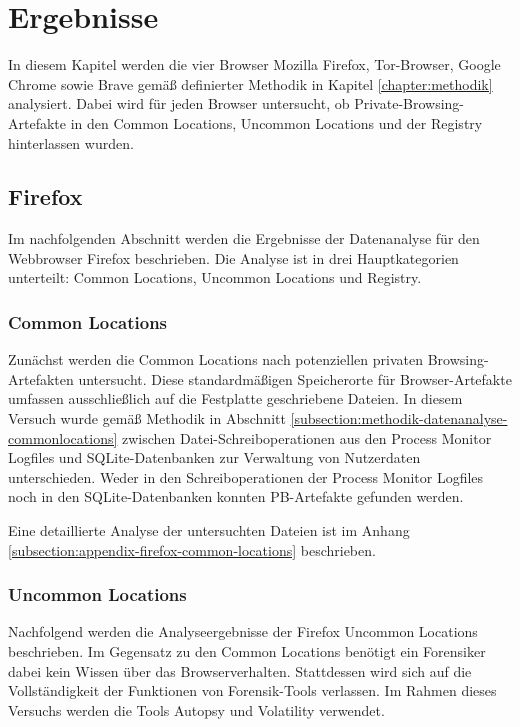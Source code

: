 \chapter{Ergebnisse}
\label{chapter:ergebnisse}

In diesem Kapitel werden die vier Browser Mozilla Firefox, Tor-Browser, Google Chrome sowie Brave gemäß definierter Methodik in Kapitel \ref{chapter:methodik} analysiert. Dabei wird für jeden Browser untersucht, ob Private-Browsing-Artefakte in den Common Locations, Uncommon Locations und der Registry hinterlassen wurden. 


\section{Firefox}
\label{section:ergebnisse-firefox}
Im nachfolgenden Abschnitt werden die Ergebnisse der Datenanalyse für den Webbrowser Firefox beschrieben. Die Analyse ist in drei Hauptkategorien unterteilt: Common Locations, Uncommon Locations und Registry.

\subsection*{Common Locations}
\label{subsection:ergebnisse-firefox-commonlocations}
Zunächst werden die Common Locations nach potenziellen privaten Browsing-Artefakten untersucht. Diese standardmäßigen Speicherorte für Browser-Artefakte umfassen ausschließlich auf die Festplatte geschriebene Dateien. In diesem Versuch wurde gemäß Methodik in Abschnitt \ref{subsection:methodik-datenanalyse-commonlocations} zwischen Datei-Schreiboperationen aus den Process Monitor Logfiles und SQLite-Datenbanken zur Verwaltung von Nutzerdaten unterschieden. Weder in den Schreiboperationen der Process Monitor Logfiles noch in den SQLite-Datenbanken konnten PB-Artefakte gefunden werden. 

Eine detaillierte Analyse der untersuchten Dateien ist im Anhang \ref{subsection:appendix-firefox-common-locations} beschrieben.

\subsection*{Uncommon Locations}
\label{subsection:ergebnisse-firefox-uncommonlocations}
Nachfolgend werden die Analyseergebnisse der Firefox Uncommon Locations beschrieben.
Im Gegensatz zu den Common Locations benötigt ein Forensiker dabei kein Wissen über das Browserverhalten. Stattdessen wird sich auf die Vollständigkeit der Funktionen von Forensik-Tools verlassen. Im Rahmen dieses Versuchs werden die Tools Autopsy und Volatility verwendet.


